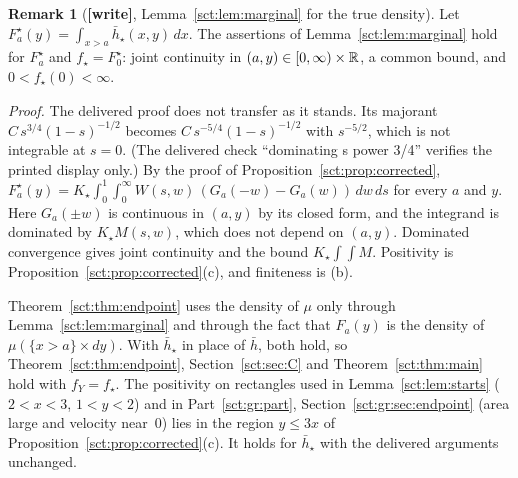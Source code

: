 \documentclass[11pt,letterpaper]{article}
\theoremstyle{definition}\newtheorem{remark}[theorem]{Remark}
\newcommand{\fY}{f_Y}\newcommand{\code}[1]{\texttt{#1}}
\newcommand{\hstar}{\bar h_\star}\newcommand{\fstar}{f_\star}\newcommand{\Kstar}{K_\star}
\newcommand{\wtag}{\textup{\textbf{[write]}}}
\begin{document}
\begin{remark}[\wtag, Lemma~\ref{sct:lem:marginal} for the true density]\label{sct:rem:lemmafix}
Let $F^\star_a(y)=\int_{x>a}\hstar(x,y)\,dx$. The assertions of Lemma~\ref{sct:lem:marginal} hold for $F^\star_a$ and $\fstar=F^\star_0$: joint continuity in $(a,y)\in[0,\infty)\times\mathbb R$, a common bound, and $0<\fstar(0)<\infty$.

\emph{Proof.} The delivered proof does not transfer as it stands. Its majorant $C\,s^{3/4}(1-s)^{-1/2}$ becomes $C\,s^{-5/4}(1-s)^{-1/2}$ with $s^{-5/2}$, which is not integrable at $s=0$. (The delivered check ``dominating s power 3/4'' verifies the printed display only.) By the proof of Proposition~\ref{sct:prop:corrected}, $F^\star_a(y)=\Kstar\int_0^1\int_0^\infty W(s,w)\,(G_a(-w)-G_a(w))\,dw\,ds$ for every $a$ and $y$. Here $G_a(\pm w)$ is continuous in $(a,y)$ by its closed form, and the integrand is dominated by $\Kstar M(s,w)$, which does not depend on $(a,y)$. Dominated convergence gives joint continuity and the bound $\Kstar\int\int M$. Positivity is Proposition~\ref{sct:prop:corrected}(c), and finiteness is (b).

Theorem~\ref{sct:thm:endpoint} uses the density of $\mu$ only through Lemma~\ref{sct:lem:marginal} and through the fact that $F_a(y)$ is the density of $\mu(\{x>a\}\times dy)$. With $\hstar$ in place of $\bar h$, both hold, so Theorem~\ref{sct:thm:endpoint}, Section~\ref{sct:sec:C} and Theorem~\ref{sct:thm:main} hold with $\fY=\fstar$. The positivity on rectangles used in Lemma~\ref{sct:lem:starts} ($2<x<3$, $1<y<2$) and in Part~\ref{sct:gr:part}, Section~\ref{sct:gr:sec:endpoint} (area large and velocity near~$0$) lies in the region $y\le3x$ of Proposition~\ref{sct:prop:corrected}(c). It holds for $\hstar$ with the delivered arguments unchanged.
\end{remark}
\end{document}
